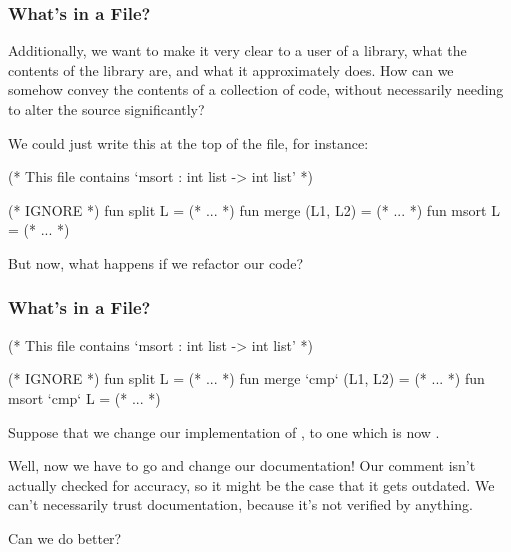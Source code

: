 \documentclass[aspectratio=169, handout]{beamer}
\begin{document}
\begin{frame}[fragile]
  \frametitle{What's in a File?}

  Additionally, we want to make it very clear to a user of a library, what the
  contents of the library are, and what it approximately does. How can we somehow
  convey the contents of a collection of code, without necessarily needing to alter
  the source significantly?

  \pause
  \vspace{\fill}

  We could just write this at the top of the file, for instance:

  \begin{codeblock}
    (* This file contains `msort : int list -> int list' *)

    (* IGNORE *)
    fun split L = (* ... *)
    fun merge (L1, L2) = (* ... *)
    fun msort L = (* ... *)
  \end{codeblock}

  \pause
  But now, what happens if we refactor our code?
\end{frame}

\begin{frame}[fragile]
  \frametitle{What's in a File?}

  \begin{codeblock}
    (* This file contains `msort : int list -> int list' *)

    (* IGNORE *)
    fun split L = (* ... *)
    fun merge `cmp` (L1, L2) = (* ... *)
    fun msort `cmp` L = (* ... *)
  \end{codeblock}

  Suppose that we change our implementation of , to one
  which is now .

  \pause
  \vspace{\fill}

  Well, now we have to go and change our documentation! Our comment
  isn't actually checked for accuracy, so it might be the case that it
  gets outdated. We can't necessarily trust documentation, because it's
  not verified by anything.

  Can we do better?
\end{frame}
\end{document}
